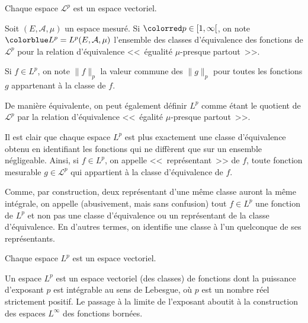 \begin{theoreme}
Chaque espace $\mathcal{L}^p$ est un espace vectoriel.
\end{theoreme}

\begin{definition}[Espace $L^p$]
Soit $(E,\mathcal{A},\mu)$ un espace mesur\'e.
Si $\colorred p\in[1,\infty[$, on note $\colorblue L^p=L^p(E,\mathcal{A},\mu)$ l'ensemble des
classes d'équivalence des fonctions de $\mathcal{L}^p$ pour la relation d'équivalence
<<~égualité $\mu$-presque partout~>>.

Si $f\in L^p$, on note $\|f\|_p$ la valeur commune des $\| g\| _p$ pour toutes les fonctions $g$
appartenant à la classe de $f$.
\end{definition}

De manière équivalente, on peut également définir $L^p$ comme étant le quotient
de $\mathcal{L}^p$ par la relation d'équivalence <<~égalité $\mu$-presque partout~>>.

\medskip
Il est clair que chaque espace $L^p$ est plus exactement une classe d'équivalence obtenu en
identifiant les fonctions qui ne diffèrent que sur un ensemble négligeable.
Ainsi, si $f\in L^p$, on appelle <<~représentant~>> de $f$, toute fonction mesurable $g\in\mathcal{L}^p$
qui appartient à la classe d'équivalence de $f$.

Comme, par construction, deux représentant d'une même classe auront la même intégrale, on
appelle (abusivement, mais sans confusion) tout $f\in L^p$ une fonction de $L^p$ et non pas une classe 
d'équivalence ou un représentant de la classe d'équivalence.
En d'autres termes, on identifie une classe à l'un quelconque de ses représentants.

\medskip
{}


\begin{theoreme}
Chaque espace $L^p$ est un espace vectoriel.
\end{theoreme}

Un espace $L^p$ est un espace vectoriel (des classes) de fonctions dont la puissance d'exposant $p$ est
intégrable au sens de Lebesgue, où $p$ est un nombre réel strictement positif.
Le passage à la limite de l'exposant aboutit à la construction des espaces $L^\infty$ des fonctions
bornées.

